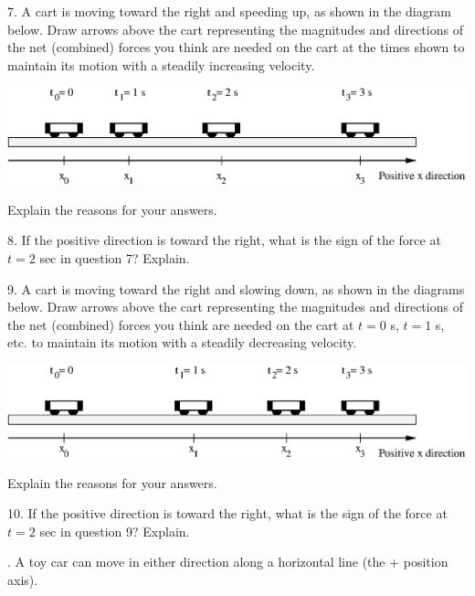 7. A cart is moving toward the right and speeding up, as shown in the diagram
below. Draw arrows above the cart representing the magnitudes and directions
of the net (combined) forces you think are needed on the cart at the times shown
to maintain its motion with a steadily increasing velocity.

\vspace{0.3cm}
{\par\centering \includegraphics{force2/force2_fig8.eps} \par}
\vspace{0.3cm}

Explain the reasons for your answers.
\answerspace{20mm}

8. If the positive direction is toward the right, what is the sign of the force
at $t = 2$ sec in question 7? Explain.
\answerspace{20mm}

9. A cart is moving toward the right and slowing down, as shown in the diagrams
below. Draw arrows above the cart representing the magnitudes and directions
of the net (combined) forces you think are needed on the cart at $t = 0$ s, 
$t
= 1$ s, etc. to maintain its motion with a steadily decreasing velocity.

\vspace{0.3cm}
{\par\centering \includegraphics{force2/force2_fig9.eps} \par}
\vspace{0.3cm}

Explain the reasons for your answers.
\answerspace{25mm}

10. If the positive direction is toward the right, what is the sign of the force
at $t = 2$ sec in question 9? Explain.
\answerspace{25mm}

. A toy car can move in either direction along a horizontal line (the + position
axis).

